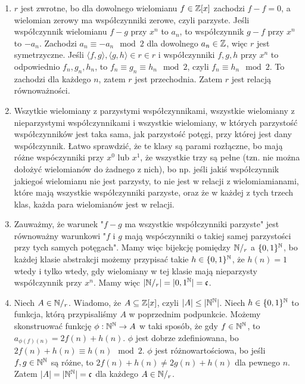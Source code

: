 \documentclass{../note}
\begin{document}
\begin{rozwiazanie}
\begin{enumerate}[label=(\alph*)]
    \item $r$ jest zwrotne, bo dla dowolnego wielomianu $f \in \mathbb{Z}[x]$ zachodzi $f - f = 0$, a wielomian zerowy ma współczynniki zerowe, czyli parzyste. Jeśli współczynnik wielomianu $f - g$ przy $x^n$ to $a_n$, to współczynnik $g - f$ przy $x^n$ to $-a_n$. Zachodzi $a_n \equiv -a_n \mod 2$ dla dowolnego $a_n \in \mathbb{Z}$, więc $r$ jest symetrzyczne. Jeśli $\langle f,g\rangle, \langle g,h\rangle\in r\in r$ i współczynniki $f, g, h$ przy $x^n$ to odpowiednio $f_n, g_n, h_n$, to $f_n \equiv g_n \equiv h_n \mod 2$, czyli $f_n \equiv h_n \mod 2$. To zachodzi dla każdego $n$, zatem $r$ jest przechodnia. Zatem $r$ jest relacją równoważności.
    \item Wszytkie wielomiany z parzystymi współczynnikami, wszystkie wielomiany z niepa\-rzystymi współczynnikami i wszystkie wielomiany, w których parzystość współczynników jest taka sama, jak parzystość potęgi, przy której jest dany współczynnik. Łatwo sprawdzić, że te klasy są parami rozłączne, bo mają różne wspóczynniki przy $x^0$ lub $x^1$, że wszystkie trzy są pełne (tzn. nie można dołożyć wielomianów do żadnego z nich), bo np. jeśli jakiś współczynnik jakiegoś wielomianu nie jest parzysty, to nie jest w relacji z wielomiamianami, które mają wszystkie współczynniki parzyste, oraz że w każdej z tych trzech klas, każda para wielomianów jest w relacji.
    \item Zauważmy, że warunek "$f-g$ ma wszystkie współczynniki parzyste" jest równoważny warunkowi "$f$ i $g$ mają wspóczynniki o takiej samej parzystości przy tych samych potęgach". Mamy więc bijekcję pomiędzy $\mathbb{N}/_r$ a $\{0, 1\}^{\mathbb{N}}$, bo każdej klasie abstrakcji możemy przypisać takie $h \in \{0, 1\}^{\mathbb{N}}$, że $h(n) = 1$ wtedy i tylko wtedy, gdy wielomiany w tej klasie mają nieparzysty współczynnik przy $x^n$. Mamy więc $|\mathbb{N}/_r| = |{0, 1}^{\mathbb{N}}| = \mathfrak{c}$.
    \item Niech $A \in \mathbb{N}/_r$. Wiadomo, że $A \subseteq \mathbb{Z}[x]$, czyli $|A| \leq |\mathbb{N}^{\mathbb{N}}|$. Niech $h \in \{0, 1\}^{\mathbb{N}}$ to funkcja, którą przypisaliśmy $A$ w poprzednim podpunkcie. Możemy skonstruować funkcję $\phi : \mathbb{N}^{\mathbb{N}} \to A$ w taki sposób, że gdy $f \in \mathbb{N}^{\mathbb{N}}$, to $a_{\phi(f)(n)} = 2f(n) + h(n)$. $\phi$ jest dobrze zdefiniowana, bo $2f(n) + h(n) \equiv h(n) \mod2$. $\phi$ jest różnowartościowa, bo jeśli $f, g \in \mathbb{N}^{\mathbb{N}}$ są różne, to $2f(n) + h(n) \neq 2g(n) + h(n)$ dla pewnego $n$. Zatem $|A| = |\mathbb{N}^{\mathbb{N}}| = \mathfrak{c}$ dla każdego $A \in \mathbb{N}/_r$.
\end{enumerate}
\end{rozwiazanie}
\end{document}
